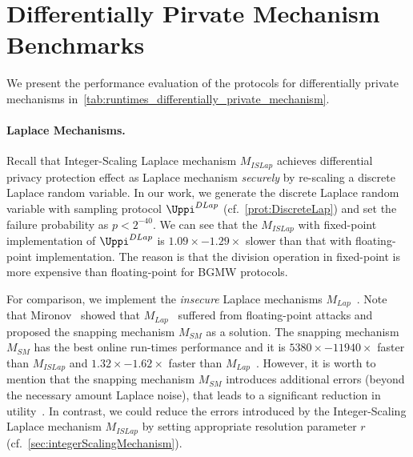 \section{Differentially Pirvate Mechanism Benchmarks}
\label{DifferentiallyPirvateMechanismBenchmarks}

We present the performance evaluation of the \smpc protocols for differentially private mechanisms in~\autoref{tab:runtimes_differentially_private_mechanism}.

\paragraph{Laplace Mechanisms.}
Recall that Integer-Scaling Laplace mechanism $M_{ISLap} $ achieves differential privacy protection effect as Laplace mechanism \textit{securely} by re-scaling a discrete Laplace random variable.
In our work, we generate the discrete Laplace random variable with sampling protocol $\Uppi^{DLap}$ (cf.~\autoref{prot:DiscreteLap}) and set the failure probability as $p<2^{-40}$.
We can see that the $M_{ISLap}$ with fixed-point implementation of $\Uppi^{DLap}$ is $1.09\times-1.29\times$ slower than that with floating-point implementation.
The reason is that the division operation in fixed-point is more expensive than floating-point for BGMW protocols.

For comparison, we implement the \textit{insecure} Laplace mechanisms $M_{Lap}$~\cite{eigner2014differentially}.
Note that Mironov~\cite{mironov2012significance} showed that $M_{Lap}$~\cite{eigner2014differentially} suffered from floating-point attacks and proposed the snapping mechanism $M_{SM}$ as a solution.
The snapping mechanism $M_{SM}$ has the best online run-times performance and it is $5380\times-11940\times $ faster than $M_{ISLap}$ and $1.32\times- 1.62\times$ faster than $M_{Lap}$~\cite{eigner2014differentially}.
However, it is worth to mention that the snapping mechanism $M_{SM}$ introduces additional errors (beyond the necessary amount Laplace noise), that leads to a significant reduction in utility~\cite{Covington2019,googleDP2019}.
In contrast, we could reduce the errors introduced by the Integer-Scaling Laplace mechanism $M_{ISLap}$ by setting appropriate resolution parameter $r$ (cf.~\autoref{sec:integerScalingMechanism}).






